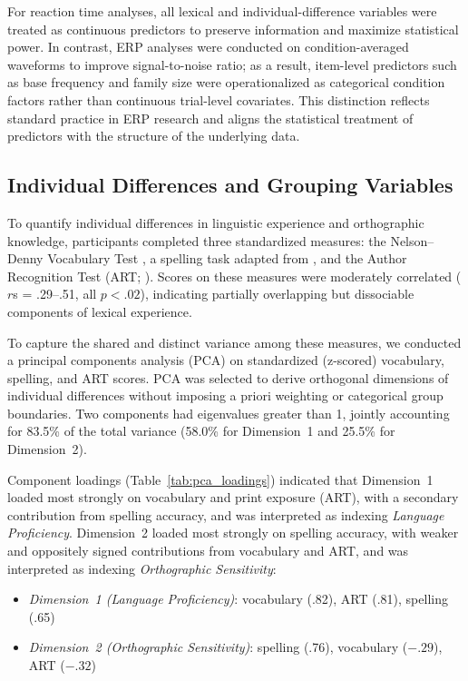 \documentclass[preprint,12pt, authoryear, review]{elsarticle}
\begin{document}
For reaction time analyses, all lexical and individual-difference variables were treated as continuous predictors to preserve information and maximize statistical power. In contrast, ERP analyses were conducted on condition-averaged waveforms to improve signal-to-noise ratio; as a result, item-level predictors such as base frequency and family size were operationalized as categorical condition factors rather than continuous trial-level covariates. This distinction reflects standard practice in ERP research and aligns the statistical treatment of predictors with the structure of the underlying data.

\subsection{Individual Differences and Grouping Variables}

To quantify individual differences in linguistic experience and orthographic knowledge, participants completed three standardized measures: the Nelson–Denny Vocabulary Test \citep{nelson1960}, a spelling task adapted from \citet{sawi2016}, and the Author Recognition Test (ART; \citealt{stanovich1989}). Scores on these measures were moderately correlated ($r$s = .29–.51, all $p < .02$), indicating partially overlapping but dissociable components of lexical experience.

To capture the shared and distinct variance among these measures, we conducted a principal components analysis (PCA) on standardized (z-scored) vocabulary, spelling, and ART scores. PCA was selected to derive orthogonal dimensions of individual differences without imposing a priori weighting or categorical group boundaries. Two components had eigenvalues greater than 1, jointly accounting for 83.5\% of the total variance (58.0\% for Dimension~1 and 25.5\% for Dimension~2).

Component loadings (Table~\ref{tab:pca_loadings}) indicated that Dimension~1 loaded most strongly on vocabulary and print exposure (ART), with a secondary contribution from spelling accuracy, and was interpreted as indexing \textit{Language Proficiency}. Dimension~2 loaded most strongly on spelling accuracy, with weaker and oppositely signed contributions from vocabulary and ART, and was interpreted as indexing \textit{Orthographic Sensitivity}:

\begin{itemize}
	\item[-] \textit{Dimension~1 (Language Proficiency)}: vocabulary (.82), ART (.81), spelling (.65)
	\item[-] \textit{Dimension~2 (Orthographic Sensitivity)}: spelling (.76), vocabulary ($- .29$), ART ($- .32$)
\end{itemize}
\end{document}
